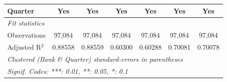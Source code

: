 \begin{tabular}{lcccccc}
   Quarter                      & Yes            & Yes            & Yes                   & Yes             & Yes            & Yes\\  
   \midrule
   \emph{Fit statistics}\\
   Observations                 & 97,084         & 97,084         & 97,084                & 97,084          & 97,084         & 97,084\\  
   Adjusted R$^2$               & 0.88558        & 0.88559        & 0.60300               & 0.60288         & 0.70081        & 0.70078\\  
   \midrule \midrule
   \multicolumn{7}{l}{\emph{Clustered (Bank \& Quarter) standard-errors in parentheses}}\\
   \multicolumn{7}{l}{\emph{Signif. Codes: ***: 0.01, **: 0.05, *: 0.1}}\\
\end{tabular}
\par\endgroup


